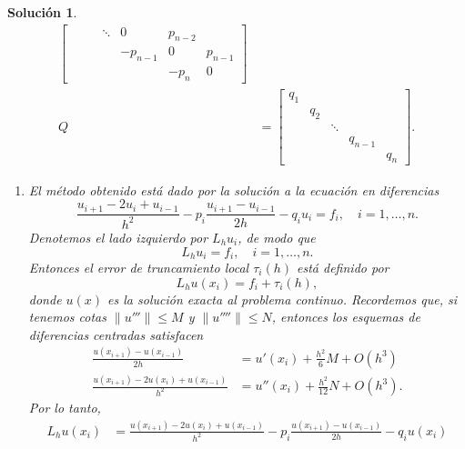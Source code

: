 \documentclass[11pt]{article}
\newtheorem*{sol}{Solución}
\begin{document}
\begin{sol}
\begin{align}
\begin{bmatrix}
           &  & & \ddots & 0 & p_{n-2} \\
           &&&& -p_{n-1} & 0 & p_{n-1} \\
           &&&& & -p_n & 0
      \end{bmatrix}
    \\
      Q
      &=
      \begin{bmatrix}
        q_1 \\
        & q_2 \\
        & & \ddots \\
        & & & q_{n-1} \\
        & & & & q_{n}
      \end{bmatrix}
  .\end{align}
  \begin{enumerate}
    \item
      El método obtenido está dado por la solución a la ecuación en
      diferencias
      \begin{equation}
        \frac{u_{i+1}-2u_{i}+u_{i-1}}{h^{2}}
        - p_i
        \frac{u_{i+1}-u_{i-1}}{2h}
        - q_i
        u_i
        =
        f_i,
        \quad i=1,\dots,n
      .\end{equation}
      Denotemos el lado izquierdo por $L_hu_i$, de modo que
      \begin{equation}
        L_hu_i = f_i,
        \quad i=1,\dots,n
      .\end{equation}
      Entonces el error de truncamiento local
      $\tau_{i}(h)$ está definido por
      \begin{equation}
        L_hu(x_i) = f_i + \tau_{i}(h)
      ,\end{equation}
      donde $u(x)$ es la solución exacta al problema continuo.
      Recordemos que, si tenemos cotas $\|u'''\|\leq M$ y
      $\|u''''\|\leq N$, entonces los esquemas de diferencias
      centradas satisfacen
      \begin{align}
        \frac{u(x_{i+1})-u(x_{i-1})}{2h}
        &= 
        u'(x_i)
        + \frac{h^{2}}{6}M
        + O(h^{3})
        \\
        \frac{u(x_{i+1})-2u(x_{i})+u(x_{i-1})}{h^{2}}
        &=
        u''(x_i)
        + \frac{h^{2}}{12}N
        + O(h^{3})
      .\end{align}
      Por lo tanto,
      \begin{align}
        L_hu(x_i)
          &=
          \frac{u(x_{i+1})-2u(x_{i})+u(x_{i-1})}{h^{2}}
          - p_i
          \frac{u(x_{i+1})-u(x_{i-1})}{2h}
          - q_i
          u(x_i)

\end{align}
\end{enumerate}
\end{sol}
\end{document}
